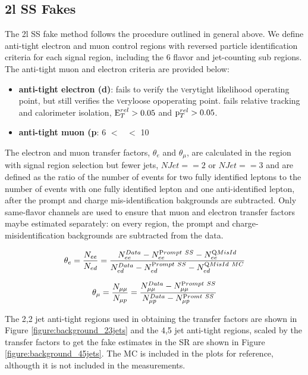 \subsection{2l SS Fakes}
The 2l SS fake method follows the procedure outlined in general above. We define anti-tight electron and muon control regions with reversed particle identification criteria for each signal region, including the 6 flavor and jet-counting sub regions. The anti-tight muon and electron criteria are provided below:
  
\begin{itemize}

\item {\bf anti-tight electron (d)}: fails to verify the {\textsc verytight} likelihood operating point, but still verifies the {\textsc veryloose} opoperating point. fails relative tracking and calorimeter isolation, $\rm E_{T}^{rel}>0.05$ and $\rm p_{T}^{rel}>0.05$.

\item {\bf anti-tight muon (p}: 6 \gevc $<$ \pt\ $<$ 10 \gevc

\end{itemize}

The electron and muon transfer factors, $\theta_e$ and $\theta_{\mu}$, are calculated in the region with signal region selection but fewer jets, $NJet == 2$ or $NJet ==3$ and are defined as the ratio of the number of events for two fully identified leptons to the number of events with one fully identified lepton and one anti-identified lepton, after the prompt and charge mis-identification bakgrounds are subtracted. Only same-flavor channels are used to ensure that muon and electron transfer factors maybe estimated separately:
on every region, the prompt and charge-misidentification backgrounds are subtracted from the data. 

 \begin{equation}
 \theta_{e} = \frac{N_{ee}}{N_{ed}}= \frac{  N^{Data}_{ee} - N^{\rm
 Prompt~SS}_{ee} - N^{\rm QMisId}_{ee} }{ N_{ed}^{Data} - N^{\rm
 Prompt~SS}_{ed} - N^{\rm QMisId~MC}_{ed} } 
\end{equation}
\label{equation:ss_def_thee}


 \begin{equation}
 \theta_{\mu} = \frac{N_{\mu\mu}}{N_{\mu p}}= \frac{ N_{\mu\mu}^{Data} - N^{\rm
 Prompt~SS}_{\mu\mu}}{ N_{\mu p}^{Data} - N^{\rm
 Promt~SS}_{\mu p} } 
\end{equation}
\label{equation:ss_def_thmm}

The 2,2 jet anti-tight regions used in obtaining the transfer factors are shown in Figure \ref{figure:background_23jets} and the 4,5 jet
anti-tight regions, scaled by the transfer factors to get the fake estimates in the SR are shown in Figure \ref{figure:background_45jets}. 
The \ttbar MC is included in the plots for reference, althougth it is not included in the measurements. 

